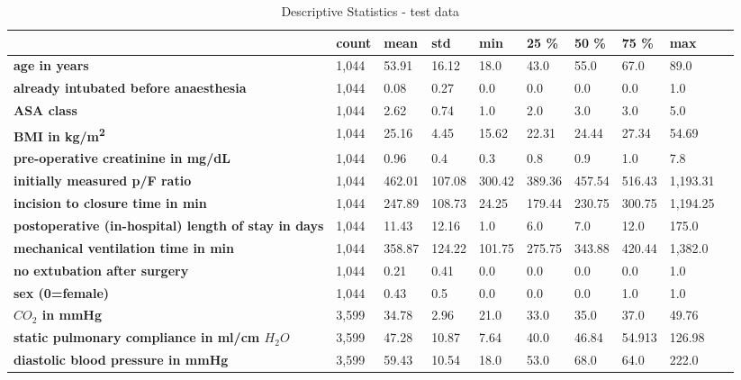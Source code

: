 \documentclass[referee,lineno,pdflatex,sn-nature]{sn-jnl}%
\theoremstyle{thmstyleone}%
\theoremstyle{thmstyletwo}%
\theoremstyle{thmstylethree}%
\begin{document}
\begin{appendices}
\begin{table}
    \centering
    \caption{Descriptive Statistics - test data}%
    \begin{tabularx}{\textwidth}{@{} L lllllllll @{}}
    \toprule
        \textbf{} & \textbf{count} & \textbf{mean} & \textbf{std} & \textbf{min} & \textbf{25 \%} & \textbf{50 \%} & \textbf{75 \%} & \textbf{max} \\ 
        \midrule
        \textbf{\footnotemark[1]age in years} & 1,044 & 53.91 & 16.12 & 18.0 & 43.0 & 55.0 & 67.0 & 89.0 \\ 
        \textbf{\footnotemark[1]already intubated before anaesthesia} & 1,044 & 0.08 & 0.27 & 0.0 & 0.0 & 0.0 & 0.0 & 1.0 \\ 
        \textbf{\footnotemark[1]ASA class} & 1,044 & 2.62 & 0.74 & 1.0 & 2.0 & 3.0 & 3.0 & 5.0 \\ 
        \textbf{\footnotemark[1]BMI in kg/m\textsuperscript{2}} & 1,044 & 25.16 & 4.45 & 15.62 & 22.31 & 24.44 & 27.34 & 54.69 \\ 
        \textbf{\footnotemark[1]pre-operative creatinine in mg/dL} & 1,044 & 0.96 & 0.4 & 0.3 & 0.8 & 0.9 & 1.0 & 7.8 \\ 
        \textbf{\footnotemark[1]initially measured p/F ratio} & 1,044 & 462.01 & 107.08 & 300.42 & 389.36 & 457.54 & 516.43 & 1,193.31 \\ 
        \textbf{\footnotemark[1]incision to closure time in min} & 1,044 & 247.89 & 108.73 & 24.25 & 179.44 & 230.75 & 300.75 & 1,194.25 \\ 
        \textbf{\footnotemark[1]postoperative (in-hospital) length of stay in days} & 1,044 & 11.43 & 12.16 & 1.0 & 6.0 & 7.0 & 12.0 & 175.0 \\ 
        \textbf{\footnotemark[1]mechanical ventilation time in min} & 1,044 & 358.87 & 124.22 & 101.75 & 275.75 & 343.88 & 420.44 & 1,382.0 \\ 
        \textbf{\footnotemark[1]no extubation after surgery} & 1,044 & 0.21 & 0.41 & 0.0 & 0.0 & 0.0 & 0.0 & 1.0 \\ 
        \textbf{\footnotemark[1]sex (0=female)} & 1,044 & 0.43 & 0.5 & 0.0 & 0.0 & 0.0 & 1.0 & 1.0 \\ 
        \textbf{\footnotemark[2]$CO_2$ in mmHg} & 3,599 & 34.78 & 2.96 & 21.0 & 33.0 & 35.0 & 37.0 & 49.76 \\ 
        \textbf{\footnotemark[2]static pulmonary compliance in ml/cm $H_2O$} & 3,599 & 47.28 & 10.87 & 7.64 & 40.0 & 46.84 & 54.913 & 126.98 \\ 
        \textbf{\footnotemark[2]diastolic blood pressure in mmHg} & 3,599 & 59.43 & 10.54 & 18.0 & 53.0 & 68.0 & 64.0 & 222.0 \\ 

\end{tabularx}
\end{table}
\end{appendices}
\end{document}
